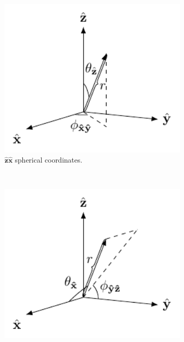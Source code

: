 \documentclass[11pt]{article}
\providecommand{\mb}[1]{\mathbf{#1}}
\begin{document}
\begin{figure}[h]
 \captionsetup{width=1.0\linewidth}
 \centering
 \begin{subfigure}[t]{0.25\textwidth}
   \centering
   \includegraphics[width = 1.0\textwidth]{../figures/frames/frames_a.pdf}
   \caption{$\hat{\mathbf{z}}\mb{\hat{x}}$ spherical coordinates.}
   \label{fig:frames_a}
 \end{subfigure}%
 ~
 \begin{subfigure}[t]{0.25\textwidth}
   \centering
   \includegraphics[width = 1.0\textwidth]{../figures/frames/frames_b.pdf}

\end{subfigure}
\end{figure}
\end{document}
